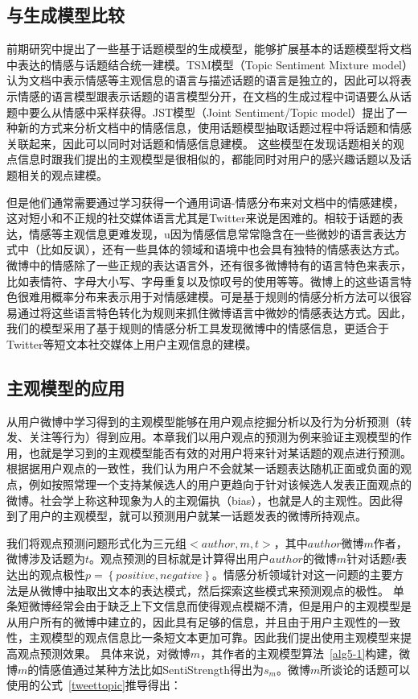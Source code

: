 \subsection{与生成模型比较}
\label{comparison}
前期研究中提出了一些基于话题模型的生成模型，能够扩展基本的话题模型将文档中表达的情感与话题结合统一建模。TSM模型（Topic Sentiment Mixture model）认为文档中表示情感等主观信息的语言与描述话题的语言是独立的，因此可以将表示情感的语言模型跟表示话题的语言模型分开，在文档的生成过程中词语要么从话题中要么从情感中采样获得。JST模型（Joint Sentiment/Topic model）提出了一种新的方式来分析文档中的情感信息，使用话题模型抽取话题过程中将话题和情感关联起来，因此可以同时对话题和情感信息建模。
这些模型在发现话题相关的观点信息时跟我们提出的主观模型是很相似的，都能同时对用户的感兴趣话题以及话题相关的观点建模。

但是他们通常需要通过学习获得一个通用词语-情感分布来对文档中的情感建模，这对短小和不正规的社交媒体语言尤其是Twitter来说是困难的。相较于话题的表达，情感等主观信息更难发现，u因为情感信息常常隐含在一些微妙的语言表达方式中（比如反讽），还有一些具体的领域和语境中也会具有独特的情感表达方式。微博中的情感除了一些正规的表达语言外，还有很多微博特有的语言特色来表示，比如表情符、字母大小写、字母重复以及惊叹号的使用等等。微博上的这些语言特色很难用概率分布来表示用于对情感建模。可是基于规则的情感分析方法可以很容易通过将这些语言特色转化为规则来抓住微博语言中微妙的情感表达方式。因此，我们的模型采用了基于规则的情感分析工具发现微博中的情感信息，更适合于Twitter等短文本社交媒体上用户主观信息的建模。

\subsection{主观模型的应用}
\label{application}
从用户微博中学习得到的主观模型能够在用户观点挖掘分析以及行为分析预测（转发、关注等行为）得到应用。本章我们以用户观点的预测为例来验证主观模型的作用，也就是学习到的主观模型能否有效的对用户将来针对某话题的观点进行预测。根据据用户观点的一致性，我们认为用户不会就某一话题表达随机正面或负面的观点，例如按照常理一个支持某候选人的用户更趋向于针对该候选人发表正面观点的微博。社会学上称这种现象为人的主观偏执（bias），也就是人的主观性。因此得到了用户的主观模型，就可以预测用户就某一话题发表的微博所持观点。

我们将观点预测问题形式化为三元组$ < author, m, t >$，其中$author$微博$ m $作者，微博涉及话题为$ t $。观点预测的目标就是计算得出用户$author$的微博$ m $针对话题$ t $表达出的观点极性$ p=\left\{positive,negative\right\} $。情感分析领域针对这一问题的主要方法是从微博中抽取出文本的表达模式，然后探索这些模式来预测观点的极性。
单条短微博经常会由于缺乏上下文信息而使得观点模糊不清，但是用户的主观模型是从用户所有的微博中建立的，因此具有足够的信息，并且由于用户主观性的一致性，主观模型的观点信息比一条短文本更加可靠。因此我们提出使用主观模型来提高观点预测效果。
具体来说，对微博$ m $，其作者的主观模型算法~\ref{alg5-1}构建，微博$ m $的情感值通过某种方法比如SentiStrength得出为$s_m$。微博$ m $所谈论的话题可以使用的公式~\ref{tweettopic}推导得出：

